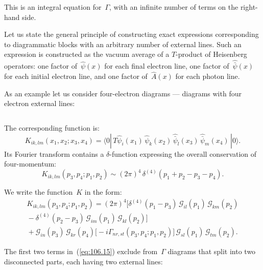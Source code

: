\noindent This is an integral equation for~$\Gamma$, with an infinite number of terms on the right-hand side.

Let us state the general principle of constructing exact expressions corresponding to diagrammatic blocks with an arbitrary number of external lines. Such an expression is constructed as the vacuum average of a $T$-product of Heisenberg operators: one factor of~$\hat{\psi}(x)$ for each final electron line, one factor of~$\hat{\bar{\psi}}(x)$ for each initial electron line, and one factor of~$\hat{A}(x)$ for each photon line.

As an example let us consider four-electron diagrams --- diagrams with four electron external lines:

\begin{equation}
\label{eq:106.12}
\end{equation}

\noindent The corresponding function is:
\begin{equation}
K_{ik,lm}(x_1, x_2; x_3, x_4) = \langle 0|\,T\hat{\psi}_i(x_1)\,\hat{\psi}_k(x_2)\,\hat{\bar{\psi}}_l(x_3)\,\hat{\bar{\psi}}_m(x_4)\,|0\rangle.
\label{eq:106.13}
\end{equation}
Its Fourier transform contains a $\delta$-function expressing the overall conservation of four-momentum:
\begin{equation}
K_{ik,lm}(p_3, p_4; p_1, p_2) \sim (2\pi)^4\,\delta^{(4)}(p_1 + p_2 - p_3 - p_4).
\label{eq:106.14}
\end{equation}

We write the function~$K$ in the form:
\begin{multline}
K_{ik,lm}(p_3, p_4; p_1, p_2) = (2\pi)^4\bigl[\delta^{(4)}(p_1 - p_3)\,\mathcal{G}_{il}(p_1)\,\mathcal{G}_{km}(p_2) \\
{} - \delta^{(4)}(p_2 - p_3)\,\mathcal{G}_{im}(p_1)\,\mathcal{G}_{kl}(p_2)\bigr] \\
{} + \mathcal{G}_{in}(p_3)\,\mathcal{G}_{kr}(p_4)\bigl[-i\Gamma_{nr,st}(p_3, p_4; p_1, p_2)\bigr]\,\mathcal{G}_{sl}(p_1)\,\mathcal{G}_{tm}(p_2).
\label{eq:106.15}
\end{multline}

The first two terms in~(\ref{eq:106.15}) exclude from~$\Gamma$ diagrams that split into two disconnected parts, each having two external lines:

